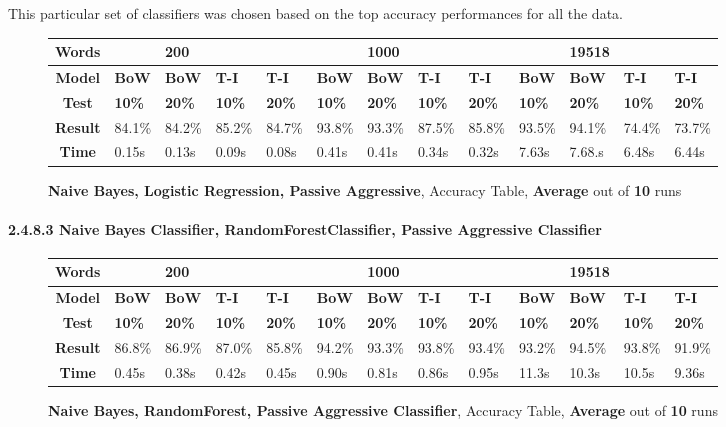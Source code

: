 \documentclass{article}
\begin{document}
	\par This particular set of classifiers was chosen based on the top accuracy performances for all the data. 
	\begin{figure}[!h]
		\begin{tabular}{||c||l|l|l|l||l|l|l|l||l|l|l|l||}
			\hline
			\textbf{Words} &  & \textbf{200} & & & &\textbf{1000} & & & & \textbf{19518} &  & \\ \hline 
			\textbf{Model} & \textbf{BoW} & \textbf{BoW} & \textbf{T-I} & \textbf{T-I} &\textbf{BoW} & \textbf{BoW} & \textbf{T-I} & \textbf{T-I} & \textbf{BoW} & \textbf{BoW} & \textbf{T-I} & \textbf{T-I}\\ \hline
			\textbf{Test} & \textbf{10\%} & \textbf{20\%} & \textbf{10\%} & \textbf{20\%} & \textbf{10\%} & \textbf{20\%} & \textbf{10\%} & \textbf{20\%} & \textbf{10\%} & \textbf{20\%} & \textbf{10\%} & \textbf{20\%} \\ \hline \hline  
			\textbf{Result} & 84.1\% & 84.2\% & 85.2\% & 84.7\% & 93.8\% & 93.3\% & 87.5\% & 85.8\% & 93.5\% & 94.1\% & 74.4\% & 73.7\%\\ \hline 
			\textbf{Time} & 0.15s & 0.13s & 0.09s & 0.08s & 0.41s & 0.41s & 0.34s & 0.32s &7.63s & 7.68.s & 6.48s  & 6.44s\\ \hline 
		\end{tabular}
		\caption{\textbf{Naive Bayes, Logistic Regression, Passive Aggressive}, Accuracy Table, \textbf{Average} out of \textbf{10} runs}
	\end{figure}
	\paragraph{2.4.8.3 Naive Bayes Classifier, RandomForestClassifier, Passive Aggressive Classifier}
	\begin{figure}[!h]
		\begin{tabular}{||c||l|l|l|l||l|l|l|l||l|l|l|l||}
			\hline
			\textbf{Words} &  & \textbf{200} & & & &\textbf{1000} & & & & \textbf{19518} &  & \\ \hline 
			\textbf{Model} & \textbf{BoW} & \textbf{BoW} & \textbf{T-I} & \textbf{T-I} &\textbf{BoW} & \textbf{BoW} & \textbf{T-I} & \textbf{T-I} & \textbf{BoW} & \textbf{BoW} & \textbf{T-I} & \textbf{T-I}\\ \hline
			\textbf{Test} & \textbf{10\%} & \textbf{20\%} & \textbf{10\%} & \textbf{20\%} & \textbf{10\%} & \textbf{20\%} & \textbf{10\%} & \textbf{20\%} & \textbf{10\%} & \textbf{20\%} & \textbf{10\%} & \textbf{20\%} \\ \hline \hline  
			\textbf{Result} & 86.8\% & 86.9\% & 87.0\% & 85.8\% & 94.2\% & 93.3\% & 93.8\% & 93.4\% & 93.2\% & 94.5\% & 93.8\% & 91.9\% \\ \hline 
			\textbf{Time} &0.45s & 0.38s & 0.42s & 0.45s & 0.90s & 0.81s & 0.86s &0.95s & 11.3s &10.3s & 10.5s &9.36s \\ \hline 
		\end{tabular}
		\caption{\textbf{Naive Bayes, RandomForest, Passive Aggressive Classifier}, Accuracy Table, \textbf{Average} out of \textbf{10} runs}
	\end{figure}
\end{document}
